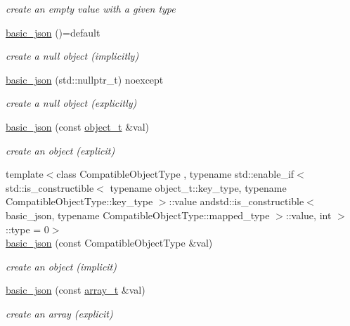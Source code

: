 \begin{DoxyCompactItemize}
\begin{DoxyCompactList}\small\item\em create an empty value with a given type \end{DoxyCompactList}\item 
\hyperlink{classnlohmann_1_1basic__json_a53771a7a4f2787125e55f64448f24ce6}{basic\-\_\-json} ()=default
\begin{DoxyCompactList}\small\item\em create a null object (implicitly) \end{DoxyCompactList}\item 
\hyperlink{classnlohmann_1_1basic__json_ade0e56c8c320d7f342e7a5697e6d6f7e}{basic\-\_\-json} (std\-::nullptr\-\_\-t) noexcept
\begin{DoxyCompactList}\small\item\em create a null object (explicitly) \end{DoxyCompactList}\item 
\hyperlink{classnlohmann_1_1basic__json_a9af5ea68c88f423ddf35216aff7f1813}{basic\-\_\-json} (const \hyperlink{classnlohmann_1_1basic__json_a0ac9894c9de8dc551cf2e5f1c605537f}{object\-\_\-t} \&val)
\begin{DoxyCompactList}\small\item\em create an object (explicit) \end{DoxyCompactList}\item 
{\footnotesize template$<$class Compatible\-Object\-Type , typename std\-::enable\-\_\-if$<$ std\-::is\-\_\-constructible$<$ typename object\-\_\-t\-::key\-\_\-type, typename Compatible\-Object\-Type\-::key\-\_\-type $>$\-::value andstd\-::is\-\_\-constructible$<$ basic\-\_\-json, typename Compatible\-Object\-Type\-::mapped\-\_\-type $>$\-::value, int $>$\-::type  = 0$>$ }\\\hyperlink{classnlohmann_1_1basic__json_ab7be2bc58ae0c2c2c30d40f15d6399f8}{basic\-\_\-json} (const Compatible\-Object\-Type \&val)
\begin{DoxyCompactList}\small\item\em create an object (implicit) \end{DoxyCompactList}\item 
\hyperlink{classnlohmann_1_1basic__json_a3aaf41d385f0d9a93deb92f9b14ae0cf}{basic\-\_\-json} (const \hyperlink{classnlohmann_1_1basic__json_ab00b882d39306d663c23dab110f5cae0}{array\-\_\-t} \&val)
\begin{DoxyCompactList}\small\item\em create an array (explicit) \end{DoxyCompactList}\item 

\end{DoxyCompactItemize}
